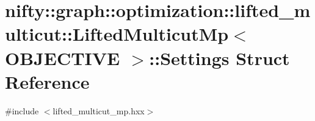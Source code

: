\hypertarget{structnifty_1_1graph_1_1optimization_1_1lifted__multicut_1_1LiftedMulticutMp_1_1Settings}{}\section{nifty\+:\+:graph\+:\+:optimization\+:\+:lifted\+\_\+multicut\+:\+:Lifted\+Multicut\+Mp$<$ O\+B\+J\+E\+C\+T\+I\+V\+E $>$\+:\+:Settings Struct Reference}
\label{structnifty_1_1graph_1_1optimization_1_1lifted__multicut_1_1LiftedMulticutMp_1_1Settings}


{\ttfamily \#include $<$lifted\+\_\+multicut\+\_\+mp.\+hxx$>$}

